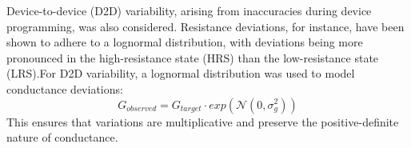 

\noindent Device-to-device (D2D) variability, arising from inaccuracies during device programming, was also considered. Resistance deviations, for instance, have been shown to adhere to a lognormal distribution, with deviations being more pronounced in the high-resistance state (HRS) than the low-resistance state (LRS).For D2D variability, a lognormal distribution was used to model conductance deviations:
\begin{equation}
    G_{observed} = G_{target} \cdot exp(\mathcal{N}(0, \sigma_g^2)) \label{eq:7.2}
\end{equation}
\noindent This ensures that variations are multiplicative and preserve the positive-definite nature of conductance.\\



